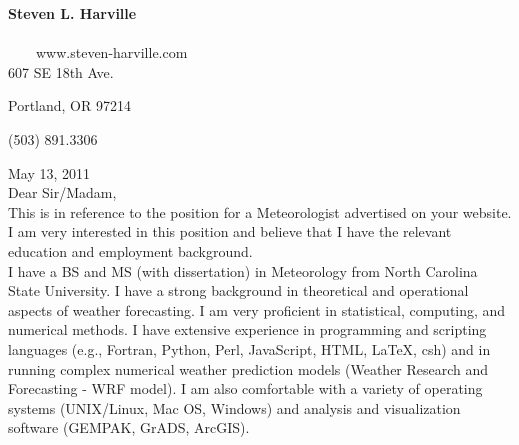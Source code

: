 \noindent \textbf{\textcolor{bluename}{\Large Steven L. Harville}} \ \ \ \ \ \ \ \ \ \ \ \ \ \ \ \ \ \ \ \ \ \ \ \ \ \ \ \ \ \ \ \ \ \ \ \ \ \ \ \ \ \ \ \ \ \ \ \ \ \ \ \ \ \ \ \ \ \ \ \ \ \ \ \ \ \ \ \ \ \ \ \ \ \ \ \ www.steven-harville.com
\\

\hfill 607 SE 18th Ave.

\hfill Portland, OR  97214

\hfill (503) 891.3306

\noindent May 13, 2011\\%


\noindent Dear Sir/Madam,
\\

\noindent This is in reference to the position for a Meteorologist advertised on your website. I am very interested in this position and believe that I have the relevant education and employment background.
\\

\noindent I have a BS and MS (with dissertation) in Meteorology from North Carolina State University. I have a strong background in theoretical and operational aspects of weather forecasting. I am very proficient in statistical, computing, and numerical methods. I have extensive experience in programming and scripting languages (e.g., Fortran, Python, Perl, JavaScript, HTML, LaTeX, csh) and in running complex numerical weather prediction models (Weather Research and Forecasting - WRF model). I am also comfortable with a variety of operating systems (UNIX/Linux, Mac OS, Windows) and analysis and visualization software (GEMPAK, GrADS, ArcGIS).
\\

\noindent 
\\

